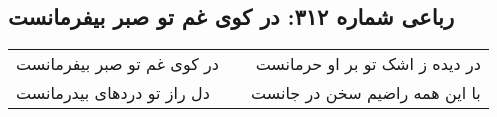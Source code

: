 \begin{center}
\section*{رباعی شماره ۳۱۲: در کوی غم تو صبر بیفرمانست}
\label{sec:0312}
\begin{longtable}{l p{0.5cm} r}
در کوی غم تو صبر بیفرمانست
&&
در دیده ز اشک تو بر او حرمانست
\\
دل راز تو دردهای بیدرمانست
&&
با این همه راضیم سخن در جانست
\\
\end{longtable}
\end{center}
